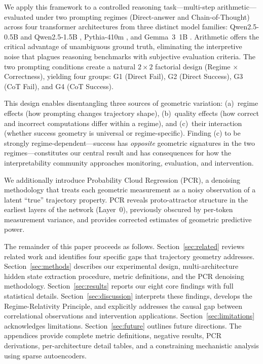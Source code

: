 \documentclass[11pt,twocolumn]{article}
\newcommand{\groupone}{\textsc{G1}}
\newcommand{\grouptwo}{\textsc{G2}}
\newcommand{\groupthree}{\textsc{G3}}
\newcommand{\groupfour}{\textsc{G4}}
\begin{document}
We apply this framework to a controlled reasoning task---multi-step arithmetic---evaluated under two prompting regimes (Direct-answer and Chain-of-Thought) across four transformer architectures from three distinct model families: Qwen2.5-0.5B and Qwen2.5-1.5B \citep{qwen2025qwen25}, Pythia-410m \citep{biderman2023pythia}, and Gemma~3~1B \citep{gemma2025gemma3}. Arithmetic offers the critical advantage of unambiguous ground truth, eliminating the interpretive noise that plagues reasoning benchmarks with subjective evaluation criteria. The two prompting conditions create a natural $2 \times 2$ factorial design (Regime $\times$ Correctness), yielding four groups: \groupone{} (Direct Fail), \grouptwo{} (Direct Success), \groupthree{} (CoT Fail), and \groupfour{} (CoT Success).

This design enables disentangling three sources of geometric variation: (a)~regime effects (how prompting changes trajectory shape), (b)~quality effects (how correct and incorrect computations differ within a regime), and (c)~their interaction (whether success geometry is universal or regime-specific). Finding (c) to be strongly regime-dependent---success has \emph{opposite} geometric signatures in the two regimes---constitutes our central result and has consequences for how the interpretability community approaches monitoring, evaluation, and intervention.

We additionally introduce Probability Cloud Regression (PCR), a denoising methodology that treats each geometric measurement as a noisy observation of a latent ``true'' trajectory property. PCR reveals proto-attractor structure in the earliest layers of the network (Layer~0), previously obscured by per-token measurement variance, and provides corrected estimates of geometric predictive power.

The remainder of this paper proceeds as follows. Section~\ref{sec:related} reviews related work and identifies four specific gaps that trajectory geometry addresses. Section~\ref{sec:methods} describes our experimental design, multi-architecture hidden state extraction procedure, metric definitions, and the PCR denoising methodology. Section~\ref{sec:results} reports our eight core findings with full statistical details. Section~\ref{sec:discussion} interprets these findings, develops the Regime-Relativity Principle, and explicitly addresses the causal gap between correlational observations and intervention applications. Section~\ref{sec:limitations} acknowledges limitations. Section~\ref{sec:future} outlines future directions. The appendices provide complete metric definitions, negative results, PCR derivations, per-architecture detail tables, and a constraining mechanistic analysis using sparse autoencoders.
\end{document}
